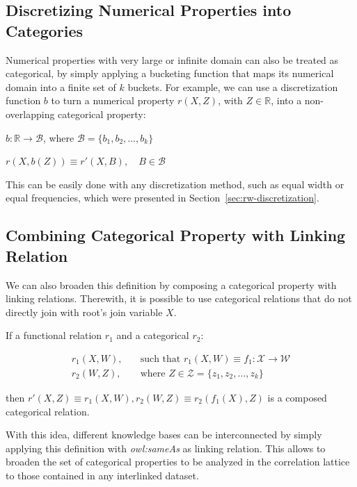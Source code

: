 \subsection{Discretizing Numerical Properties into Categories}

Numerical properties with very large or infinite domain can also be treated as categorical, by simply applying a
bucketing
function that maps its numerical domain into a finite set of $k$ buckets. For example, we can use a discretization
function $b$ to turn a numerical property $r(X,Z)$, with $Z \in \mathbb{R}$, into a non-overlapping categorical
property:

\begin{center}
 $b: \mathbb{R} \rightarrow \mathcal{B}$, where $\mathcal{B}=\{b_1,b_2,\dots ,b_k \}$
\end{center}

\begin{center}
 $r(X,b(Z)) \equiv r'(X,B) , \quad B \in \mathcal{B}$
\end{center}

This can be easily done with any discretization method, such as equal width or equal frequencies, which were
presented in Section~\ref{sec:rw-discretization}.

\subsection{Combining Categorical Property with Linking Relation}
We can also broaden this definition by composing a categorical property with linking relations. Therewith, it is
possible to use categorical relations that do not directly join with root's join variable $X$.

If a functional relation $r_1$ and a categorical $r_2$:

\begin{align*}
r_1(X,W),\quad &\text{such that }r_1(X,W) \equiv f_1 : \mathcal{X} \rightarrow \mathcal{W} \\
r_2(W,Z),\quad &\text{where }Z \in \mathcal{Z}=\{z_1,z_2,\ldots,z_k\} 
\end{align*}

then $r'(X,Z) \equiv r_1(X,W),r_2(W,Z) \equiv r_2(f_1(X),Z)$ is a composed categorical relation. 

With this idea, different knowledge bases can be interconnected by simply applying this definition with
\emph{owl:sameAs} as linking relation. This allows to broaden the set of categorical properties to be analyzed in the
correlation lattice to those contained in any interlinked dataset.

